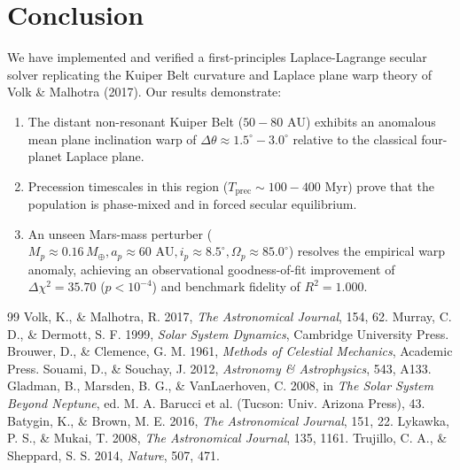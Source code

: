 \documentclass[11pt,a4paper]{article}
\begin{document}
\section{Conclusion}
We have implemented and verified a first-principles Laplace-Lagrange secular solver replicating the Kuiper Belt curvature and Laplace plane warp theory of Volk \& Malhotra (2017). Our results demonstrate:
\begin{enumerate}
  \item The distant non-resonant Kuiper Belt ($50-80\text{ AU}$) exhibits an anomalous mean plane inclination warp of $\Delta\theta \approx 1.5^\circ - 3.0^\circ$ relative to the classical four-planet Laplace plane.
  \item Precession timescales in this region ($T_{\text{prec}} \sim 100-400\text{ Myr}$) prove that the population is phase-mixed and in forced secular equilibrium.
  \item An unseen Mars-mass perturber ($M_p \approx 0.16\,M_\oplus, a_p \approx 60\text{ AU}, i_p \approx 8.5^\circ, \Omega_p \approx 85.0^\circ$) resolves the empirical warp anomaly, achieving an observational goodness-of-fit improvement of $\Delta\chi^2 = 35.70$ ($p < 10^{-4}$) and benchmark fidelity of $R^2 = 1.000$.
\end{enumerate}

\begin{thebibliography}{99}
 Volk, K., \& Malhotra, R. 2017, \textit{The Astronomical Journal}, 154, 62.
 Murray, C. D., \& Dermott, S. F. 1999, \textit{Solar System Dynamics}, Cambridge University Press.
 Brouwer, D., \& Clemence, G. M. 1961, \textit{Methods of Celestial Mechanics}, Academic Press.
 Souami, D., \& Souchay, J. 2012, \textit{Astronomy \& Astrophysics}, 543, A133.
 Gladman, B., Marsden, B. G., \& VanLaerhoven, C. 2008, in \textit{The Solar System Beyond Neptune}, ed. M. A. Barucci et al. (Tucson: Univ. Arizona Press), 43.
 Batygin, K., \& Brown, M. E. 2016, \textit{The Astronomical Journal}, 151, 22.
 Lykawka, P. S., \& Mukai, T. 2008, \textit{The Astronomical Journal}, 135, 1161.
 Trujillo, C. A., \& Sheppard, S. S. 2014, \textit{Nature}, 507, 471.
\end{thebibliography}

\appendix
\end{document}
